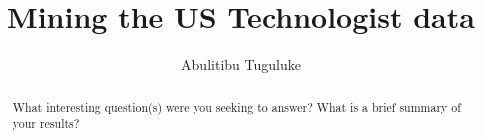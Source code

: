 \documentclass[sigconf]{acmart}
\begin{document}
	\title{Mining the US Technologist data}
	
	
	\author{Abulitibu Tuguluke}
	

		\begin{abstract}
		What interesting question(s) were you seeking to answer? What is a brief summary of your results?
	\end{abstract}
	\maketitle

	
	
%	
%	 
	
\end{document}
